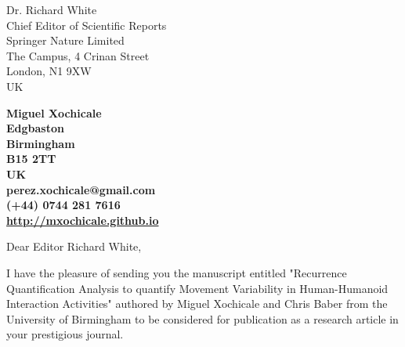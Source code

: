 \documentclass[10pt]{letter}
\begin{document}
\begin{letter}{Dr. Richard White \\
Chief Editor of Scientific Reports \\
Springer Nature Limited \\
The Campus, 4 Crinan Street\\
London, N1 9XW \\
UK
} 

\begin{flushright}
\large\bf Miguel Xochicale \\ %
Edgbaston\\
Birmingham\\
B15 2TT\\
UK\\
\faEnvelopeO  perez.xochicale@gmail.com \\
\faMobile  (+44) 0744 281 7616 \\
\faHome \href{http://mxochicale.github.io}{http://mxochicale.github.io}
\end{flushright} 

\vspace{20pt}
\signature{Miguel Xochicale} %


\opening{Dear Editor Richard White,}

I have the pleasure of sending you the manuscript entitled 
"Recurrence Quantification Analysis to quantify Movement Variability in Human-Humanoid Interaction Activities"
authored by Miguel Xochicale and Chris Baber from the University of Birmingham to be considered for publication as a research article in your prestigious journal.


\end{letter}
\end{document}
